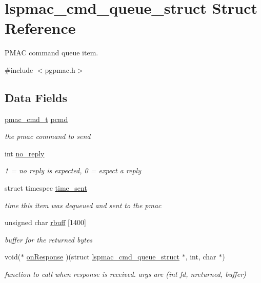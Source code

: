 \hypertarget{structlspmac__cmd__queue__struct}{\section{lspmac\-\_\-cmd\-\_\-queue\-\_\-struct Struct Reference}
\label{structlspmac__cmd__queue__struct}
}


P\-M\-A\-C command queue item.  




{\ttfamily \#include $<$pgpmac.\-h$>$}

\subsection*{Data Fields}
\begin{DoxyCompactItemize}
\item 
\hyperlink{pgpmac_8h_a2d163436571135a457f4a4e2fbd09633}{pmac\-\_\-cmd\-\_\-t} \hyperlink{structlspmac__cmd__queue__struct_a9ac7618bbe0faa3001e8efeb1d89010d}{pcmd}
\begin{DoxyCompactList}\small\item\em the pmac command to send \end{DoxyCompactList}\item 
int \hyperlink{structlspmac__cmd__queue__struct_a33f70b45f8b7c27935cd3efe28748479}{no\-\_\-reply}
\begin{DoxyCompactList}\small\item\em 1 = no reply is expected, 0 = expect a reply \end{DoxyCompactList}\item 
struct timespec \hyperlink{structlspmac__cmd__queue__struct_a276ebc4b35c2554e4cb7377b60fd89b7}{time\-\_\-sent}
\begin{DoxyCompactList}\small\item\em time this item was dequeued and sent to the pmac \end{DoxyCompactList}\item 
unsigned char \hyperlink{structlspmac__cmd__queue__struct_aa059563886db174f9bb4f7a14bc19bbe}{rbuff} \mbox{[}1400\mbox{]}
\begin{DoxyCompactList}\small\item\em buffer for the returned bytes \end{DoxyCompactList}\item 
void($\ast$ \hyperlink{structlspmac__cmd__queue__struct_a08f734865cf7ba341b8666da35ba7d84}{on\-Response} )(struct \hyperlink{structlspmac__cmd__queue__struct}{lspmac\-\_\-cmd\-\_\-queue\-\_\-struct} $\ast$, int, char $\ast$)
\begin{DoxyCompactList}\small\item\em function to call when response is received. args are (int fd, nreturned, buffer) \end{DoxyCompactList}\end{DoxyCompactItemize}


